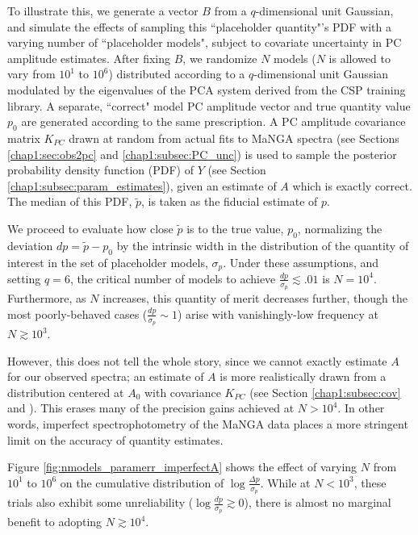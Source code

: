 To illustrate this, we generate a vector $B$ from a $q$-dimensional unit Gaussian, and simulate the effects of sampling this ``placeholder quantity"'s PDF with a varying number of ``placeholder models", subject to covariate uncertainty in PC amplitude estimates. After fixing $B$, we randomize $N$ models ($N$ is allowed to vary from $10^1$ to $10^{6}$) distributed according to a $q$-dimensional unit Gaussian modulated by the eigenvalues of the PCA system derived from the CSP training library. A separate, ``correct" model PC amplitude vector and true quantity value $p_0$ are generated according to the same prescription. A PC amplitude covariance matrix $K_{PC}$ drawn at random from actual fits to MaNGA spectra (see Sections \ref{chap1:sec:obs2pc} and \ref{chap1:subsec:PC_unc}) is used to sample the posterior probability density function (PDF) of $Y$ (see Section \ref{chap1:subsec:param_estimates}), given an estimate of $A$ which is exactly correct. The median of this PDF, $\tilde{p}$, is taken as the fiducial estimate of $p$.

We proceed to evaluate how close $\tilde{p}$ is to the true value, $p_0$, normalizing the deviation $dp = \tilde{p} - p_0$ by the intrinsic width in the distribution of the quantity of interest in the set of placeholder models, $\sigma_p$. Under these assumptions, and setting $q = 6$, the critical number of models to achieve $\frac{dp}{\sigma_p} \lesssim .01$ is $N = 10^4$. Furthermore, as $N$ increases, this quantity of merit decreases further, though the most poorly-behaved cases ($\frac{dp}{\sigma_p} \sim 1$) arise with vanishingly-low frequency at $N \gtrsim 10^3$.

However, this does not tell the whole story, since we cannot exactly estimate $A$ for our observed spectra; an estimate of $A$ is more realistically drawn from a distribution centered at $A_0$ with covariance $K_{PC}$ (see Section \ref{chap1:subsec:cov} and \citealt{manga_spectrophot}). This erases many of the precision gains achieved at $N > 10^4$. In other words, imperfect spectrophotometry of the MaNGA data places a more stringent limit on the accuracy of quantity estimates.

Figure \ref{fig:nmodels_paramerr_imperfectA} shows the effect of varying $N$ from $10^1$ to $10^6$ on the cumulative distribution of $\log \frac{\Delta p}{\sigma_p}$. While at $N < 10^3$, these trials also exhibit some unreliability ($\log \frac{dp}{\sigma_p} \gtrsim 0$), there is almost no marginal benefit to adopting $N \gtrsim 10^4$.

